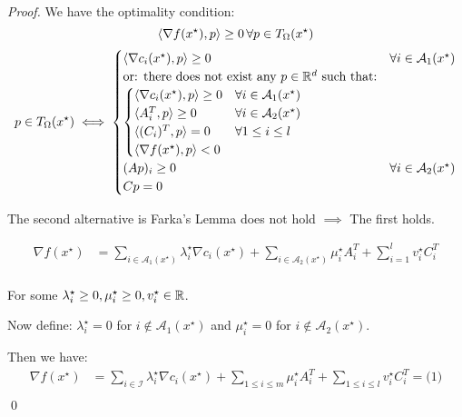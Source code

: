 \begin{proof}{}{}
	We have the optimality condition:
	\[
		\langle\nabla f(x^\star), p\rangle \geq 0 \, \forall p \in T_{\Omega}(x^\star)
	\]
	\medskip
	\begin{align*}
		p \in T_{\Omega}(x^\star) \iff
		\begin{cases}
			\langle\nabla c_i (x^\star), p \rangle\geq 0                             & \forall i \in \mathcal{A}_1(x^\star) \\
			\text{or: there does not exist any } p \in \mathbb{R}^d \text{ such that:} &                                      \\
			\begin{cases}
				\langle\nabla c_i (x^\star), p \rangle\geq 0 & \forall i \in \mathcal{A}_1(x^\star) \\
				\langle A_i^T , p \rangle\geq 0               & \forall i \in \mathcal{A}_2(x^\star) \\
				\langle (C_i )^T, p \rangle = 0              & \forall 1 \leq i \leq l              \\
				\langle\nabla f (x^\star), p \rangle < 0     &
			\end{cases}                             \\
			(Ap)_i \geq 0                                                      & \forall i \in \mathcal{A}_2(x^\star) \\
			Cp = 0                                                             &
		\end{cases}
	\end{align*}

	The second alternative is Farka's Lemma does not hold \(\implies\) The first holds.

	\begin{align*}
		\nabla f(x^\star) & = \sum_{i\in \mathcal{A}_1(x^\star)} \lambda_i^\star \nabla c_i(x^\star) + \sum_{i \in \mathcal{A}_2(x^\star)} \mu_i^\star A_i^T + \sum_{i=1}^l v_i^\star C_i^T \\
	\end{align*}

	For some  \(\lambda_i^\star \geq 0, \mu_i^\star \geq 0, v_i^\star \in \mathbb{R}\).

	Now define: \(\lambda_i^\star = 0 \) for \(i \notin \mathcal{A}_1(x^\star)\) and \(\mu_i^\star = 0\) for \(i \notin \mathcal{A}_2(x^\star)\).

	Then we have:
	\begin{align*}
		\nabla f(x^\star) & = \sum_{i\in \mathcal{I}} \lambda_i^\star \nabla c_i(x^\star) + \sum_{1 \leq i \leq m} \mu_i^\star A_i^T + \sum_{1 \leq i \leq l} v_i^\star C_i^T = \text{(1)} \\
	\end{align*}
	\qed
\end{proof}

